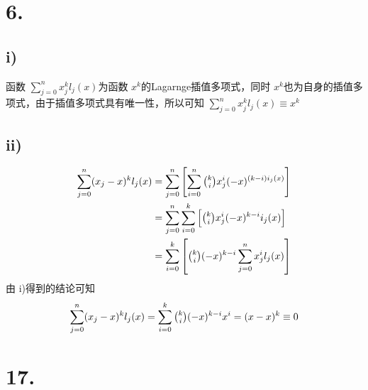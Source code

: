 \documentclass[12pt, a4paper, oneside]{ctexart}
\begin{document}
\section*{6.}
\subsection*{i)}
\noindent
函数 $\sum_{j=0}^{n}x_j^kl_j(x)$为函数 $x^k$的Lagarnge插值多项式，同时 $x^k$也为自身的插值多项式，由于插值多项式具有唯一性，所以可知 $\sum_{j=0}^{n}x_j^kl_j(x) \equiv x^k$
\subsection*{ii)}
\noindent
\begin{equation}
    \begin{split}
        \sum_{j=0}^{n}(x_j-x)^kl_j(x) &= \sum_{j=0}^{n} \left[ \sum_{i=0}^{n}\tbinom{k}{i}x_j^i(-x)^{(k-i)i_j(x)} \right] \\
        &= \sum_{j=0}^{n} \sum_{i=0}^{k} \left[ \tbinom{k}{i}x_j^i(-x)^{k-i}i_j(x) \right]\\
        &= \sum_{i=0}^{k}\left[ \tbinom{k}{i} (-x)^{k-i} \sum_{j=0}^{n}x_j^i l_j(x) \right] \\
    \end{split}
    \notag
\end{equation}
由 i)得到的结论可知
\begin{equation}
    \sum_{j=0}^{n}(x_j-x)^kl_j(x)=\sum_{i=0}^{k} \tbinom{k}{i}(-x)^{k-i}x^i = (x-x)^k \equiv 0 \notag
\end{equation}


\section*{17.}
\end{document}
